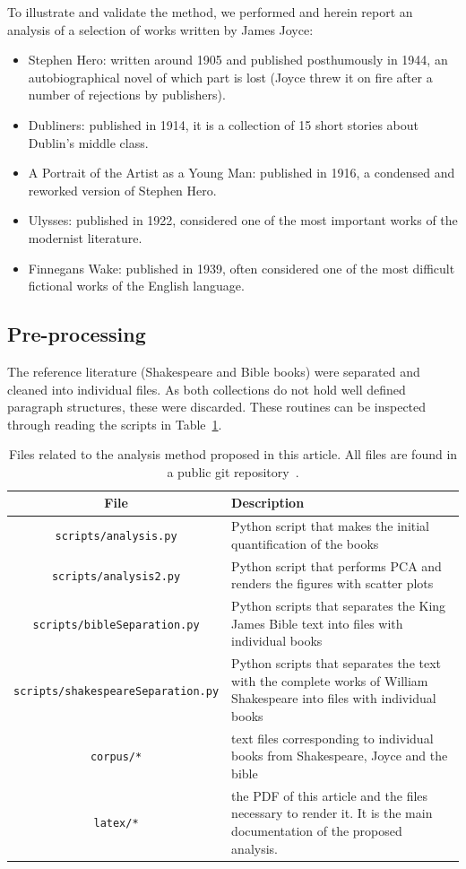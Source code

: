\documentclass[12pt,fleqn]{article}
\begin{document}
To illustrate and validate the method,
we performed and herein report an analysis of a selection of works written by James Joyce:
\begin{itemize}
    \item Stephen Hero: written around 1905 and published posthumously in 1944, an autobiographical novel of which part is lost
        (Joyce threw it on fire after a number of rejections by publishers).
    \item Dubliners: published in 1914, it is a collection of 15 short stories about Dublin's middle class.
    \item A Portrait of the Artist as a Young Man: published in 1916, a condensed and reworked version of Stephen Hero. 
    \item Ulysses: published in 1922, considered one of the most important works of the modernist literature.
    \item Finnegans Wake: published in 1939, often considered one of the most difficult fictional works of the English language.
\end{itemize}

\subsection{Pre-processing}
The reference literature (Shakespeare and Bible books) were separated and cleaned into
individual files.
As both collections do not hold well defined paragraph structures,
these were discarded.
These routines can be inspected through reading the scripts in Table~\ref{tab:files}.

\begin{table}[H] %
	\caption{Files related to the analysis method proposed in this article.
	All files are found in a public git repository~\citep{repo}.}\label{tab:files}
\vspace{12pt}
\centering{}
	\begin{tabular}{  c | p{8cm} }
	\textbf{File}           & \textbf{Description} \\\hline
	\texttt{scripts/analysis.py}  & Python script that makes the initial quantification of the books \\
	\texttt{scripts/analysis2.py}  & Python script that performs PCA and renders the figures with scatter plots \\
	\texttt{scripts/bibleSeparation.py}  & Python scripts that separates the King James Bible text into files with individual books \\
	\texttt{scripts/shakespeareSeparation.py}  & Python scripts that separates the text with the complete works of William Shakespeare into files with individual books \\
        \texttt{corpus/*}  & text files corresponding to individual books from Shakespeare, Joyce and the bible  \\
	\texttt{latex/*}  & the PDF of this article and the files necessary to render it. It is the main documentation of the proposed analysis. \\
\end{tabular}
\end{table}
\end{document}
